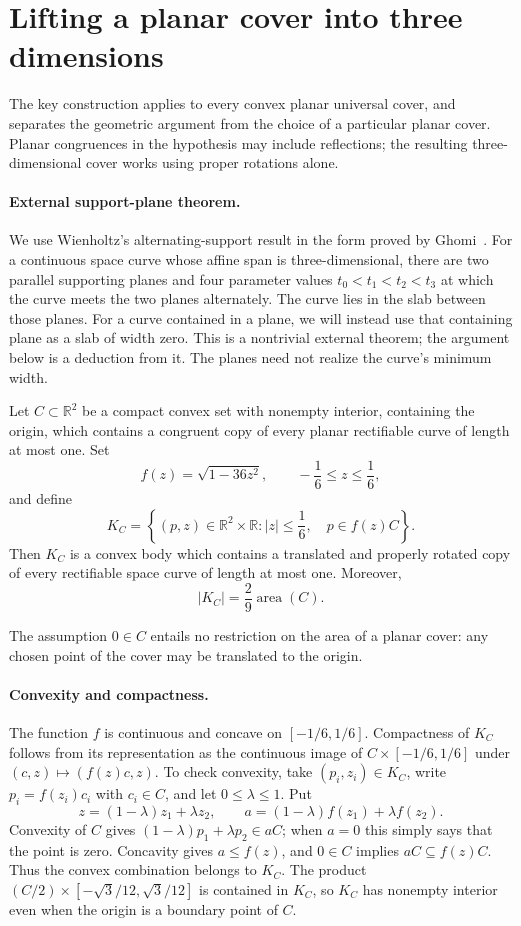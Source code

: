 \section{Lifting a planar cover into three dimensions}\label{sec:lift}
The key construction applies to every convex planar universal cover, and
separates the geometric argument from the choice of a particular planar
cover. Planar congruences in the hypothesis may include reflections; the
resulting three-dimensional cover works using proper rotations alone.

\paragraph{External support-plane theorem.}
We use Wienholtz's alternating-support result in the form proved by
Ghomi~\cite[Corollary~3.2]{Ghomi2018}.
For a continuous space curve whose affine span is three-dimensional, there
are two parallel supporting planes and four parameter values
$t_0<t_1<t_2<t_3$ at which the curve meets the two planes alternately.
The curve lies in the slab between those planes. For a curve contained in a
plane, we will instead use that containing plane as a slab of width zero.
This is a nontrivial external theorem; the argument below is a deduction
from it. The planes need not realize the curve's minimum width.

\begin{theorem}\label{thm:lift}
Let $C\subset\mathbb R^2$ be a compact convex set with nonempty interior,
containing the origin, which contains a congruent copy of every planar
rectifiable curve of length at most one. Set
\[
 f(z)=\sqrt{1-36z^2},\qquad -\frac16\le z\le\frac16,
\]
and define
\[
 K_C=\left\{(p,z)\in\mathbb R^2\times\mathbb R:
 |z|\le\frac16,\quad p\in f(z)C\right\}.
\]
Then $K_C$ is a convex body which contains a translated and properly rotated
copy of every rectifiable space curve of length at most one. Moreover,
\[
 \boxed{|K_C|=\frac29\operatorname{area}(C).}
\]
\end{theorem}
The assumption $0\in C$ entails no restriction on the area of a planar
cover: any chosen point of the cover may be translated to the origin.

\paragraph{Convexity and compactness.}
The function $f$ is continuous and concave on $[-1/6,1/6]$. Compactness of
$K_C$ follows from its representation as the continuous image of
$C\times[-1/6,1/6]$ under $(c,z)\mapsto(f(z)c,z)$. To check convexity,
take $(p_i,z_i)\in K_C$, write $p_i=f(z_i)c_i$ with $c_i\in C$, and let
$0\le\lambda\le1$. Put
\[
 z=(1-\lambda)z_1+\lambda z_2,\qquad
 a=(1-\lambda)f(z_1)+\lambda f(z_2).
\]
Convexity of $C$ gives
$(1-\lambda)p_1+\lambda p_2\in aC$; when $a=0$ this simply says that the
point is zero. Concavity gives $a\le f(z)$, and $0\in C$ implies
$aC\subseteq f(z)C$. Thus the convex combination belongs to $K_C$.
The product $(C/2)\times[-\sqrt3/12,\sqrt3/12]$ is contained in $K_C$,
so $K_C$ has nonempty interior even when the origin is a boundary point
of $C$.

